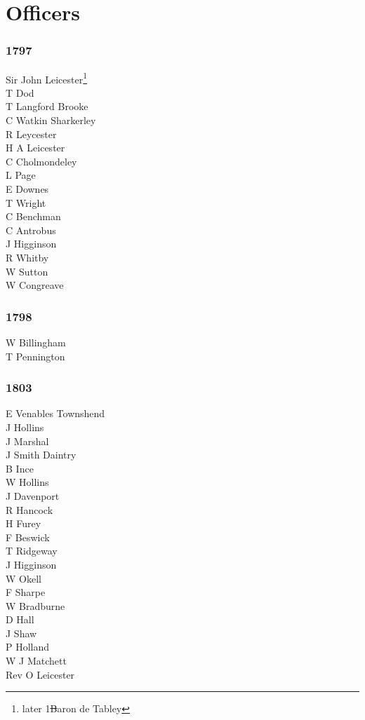 \chapter*{Officers}

\small

\begin{multicols}{3}
  \noindent
  \subsection*{1797}
  Sir John Leicester\footnote{later 1\st Baron de Tabley} \\
  T Dod \\
  T Langford Brooke \\
  C Watkin Sharkerley \\
  R Leycester \\
  H A Leicester \\
  C Cholmondeley \\
  L Page \\
  E Downes \\
  T Wright \\
  C Benchman \\
  C Antrobus \\
  J Higginson \\
  R Whitby \\
  W Sutton \\
  W Congreave \\
  \subsection*{1798}
  W Billingham \\
  T Pennington \\
  \subsection*{1803}
  E Venables Townshend \\
  J Hollins \\
  J Marshal \\
  J Smith Daintry \\
  B Ince \\
  W Hollins \\
  J Davenport \\
  R Hancock \\
  H Furey \\
  F Beswick \\
  T Ridgeway \\
  J Higginson \\
  W Okell \\
  F Sharpe \\
  W Bradburne \\
  D Hall \\
  J Shaw \\
  P Holland \\
  W J Matchett \\
  Rev O Leicester \\

\end{multicols}
